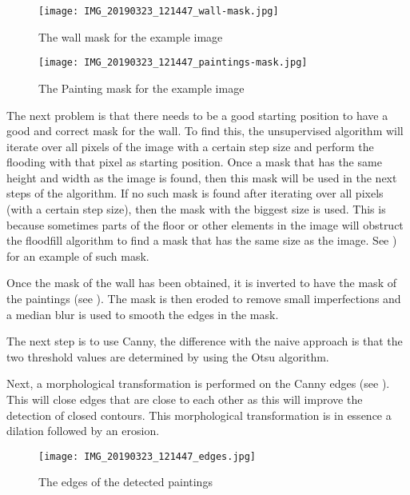 \begin{figure}[h]
    \centering
    \begin{minipage}[b]{0.45\textwidth}
        \texttt{[image: IMG\_20190323\_121447\_wall-mask.jpg]}
        \caption{The wall mask for the example image}
        \label{fig:paiting_detection_wall-mask}
    \end{minipage}
    \hfill
    \begin{minipage}[b]{0.45\textwidth}
        \texttt{[image: IMG\_20190323\_121447\_paintings-mask.jpg]}
        \caption{The Painting mask for the example image}
        \label{fig:paiting_detection_paintings-mask}
    \end{minipage}
\end{figure}

The next problem is that there needs to be a good starting position to have a good and correct mask for the wall. To find this, the unsupervised algorithm will iterate over all pixels of the image with a certain step size and perform the flooding with that pixel as starting position. Once a mask that has the same height and width as the image is found, then this mask will be used in the next steps of the algorithm. If no such mask is found after iterating over all pixels (with a certain step size), then the mask with the biggest size is used. This is because sometimes parts of the floor or other elements in the image will obstruct the floodfill algorithm to find a mask that has the same size as the image. See ) for an example of such mask.

Once the mask of the wall has been obtained, it is inverted to have the mask of the paintings (see ). The mask is then eroded to remove small imperfections and a median blur is used to smooth the edges in the mask.

The next step is to use Canny, the difference with the naive approach is that the two threshold values are determined by using the Otsu algorithm.

Next, a morphological transformation is performed on the Canny edges (see ). This will close edges that are close to each other as this will improve the detection of closed contours. This morphological transformation is in essence a dilation followed by an erosion.

\begin{figure}[ht]
    \texttt{[image: IMG\_20190323\_121447\_edges.jpg]}
    \centering
    \caption{The edges of the detected paintings}
    \label{fig:paiting_detection_paintings-edges}
\end{figure}

